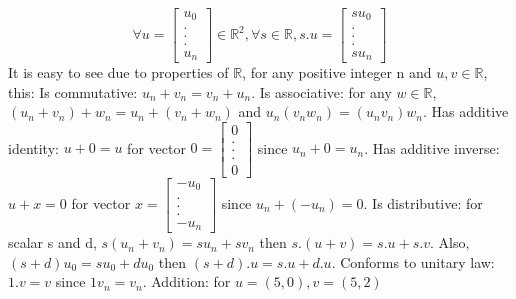 \documentclass{article}
\begin{document}
$$\forall 
u=\left[\begin{array}{c}u_0 \\.\\.\\.\\u_n\end{array}\right]\in \mathbb{R}^2,
\forall
s \in \mathbb{R}, 
s . u = \left[\begin{array}{c}s u_0\\.\\.\\.\\s u_n\end{array}\right]$$
It is easy to see due to properties of $\mathbb{R}$, for any positive integer n and $u, v\in \mathbb{R}$, this:\newline
Is commutative: $u_n + v_n = v_n + u_n$.\newline
Is associative: for any $w \in \mathbb{R}$, $(u_n + v_n) + w_n = u_n + (v_n + w_n)$ and $u_n (v_n w_n) = (u_n v_n) w_n$.\newline
Has additive identity: $u + 0 = u$ for vector $0=\left[\begin{array}{c}0\\.\\.\\.\\0\end{array}\right]$ since $u_n + 0 = u_n$.\newline
Has additive inverse: $u + x = 0$ for vector $x = \left[\begin{array}{c}-u_0\\.\\.\\.\\-u_n\end{array}\right]$ since $u_n + (-u_n) = 0$.\newline
Is distributive: for scalar s and d, $s(u_n+v_n) = s u_n + s v_n$ then $s . (u + v) = s . u + s . v$. Also, $(s+d) u_0 = s u_0 + d u_0$ then $(s + d) . u = s . u + d . u$.\newline
Conforms to unitary law: $1 . v = v$ since $1 v_n = v_n$.\newline
\newline
Addition:\newline
for $u = (5, 0), v = (5, 2)$\newline
{}\newline
\end{document}
